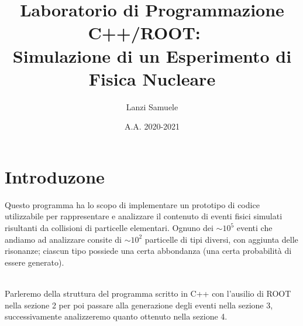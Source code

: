 \documentclass[a4paper,10 pt]{article}
\title{Laboratorio di Programmazione C++/ROOT:
\
\\
Simulazione di un Esperimento di Fisica Nucleare}
\author{Lanzi Samuele}
\date{A.A. 2020-2021}
\begin{document}
\maketitle

\section{Introduzone}
Questo programma ha lo scopo di implementare un prototipo di codice utilizzabile per rappresentare 
e analizzare il contenuto di eventi fisici simulati risultanti da collisioni di particelle elementari.
Ognuno dei $\sim 10^5$ eventi che andiamo ad analizzare consite di $\sim 10^2$ particelle di tipi diversi, 
con aggiunta delle risonanze; ciascun tipo possiede una certa abbondanza (una certa probabilità di essere generato).

\
\\
Parleremo della struttura del programma scritto in C++ con l'ausilio di ROOT nella sezione 2 per poi passare alla 
generazione degli eventi nella sezione 3, successivamente analizzeremo quanto ottenuto nella sezione 4.
\end{document}
